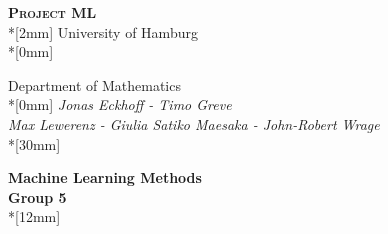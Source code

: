 \begin{titlepage}
\begin{center}                     
        {\Large\scshape \textbf{Project ML}}\\*[2mm]
				{\large University of Hamburg}\\*[0mm]

				{\large Department of Mathematics}\\*[0mm]
				{\large \emph{Jonas Eckhoff - Timo Greve\\ 
Max Lewerenz - Giulia Satiko Maesaka - John-Robert Wrage}}\\*[30mm]
				

        {\bf \LARGE Machine Learning Methods
         \\ Group 5}\\*[12mm]

\end{center}  

\end{titlepage}
\newpage


\setcounter{page}{2}

\tableofcontents
\newpage

\newpage

\newpage


\setcounter{page}{1}